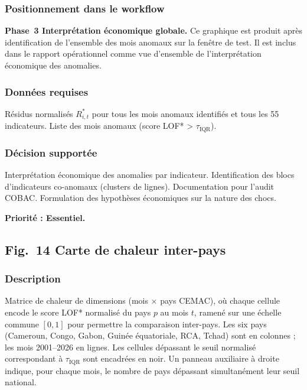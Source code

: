 \documentclass[12pt,a4paper]{article}
\begin{document}
\subsubsection{Positionnement dans le workflow}

\textbf{Phase~3  Interprétation économique globale.} Ce graphique est
produit après identification de l'ensemble des mois anomaux sur la fenêtre
de test. Il est inclus dans le rapport opérationnel comme vue d'ensemble
de l'interprétation économique des anomalies.

\subsubsection{Données requises}

Résidus normalisés $R_{i,t}^*$ pour tous les mois anomaux identifiés et
tous les 55 indicateurs. Liste des mois anomaux (score LOF* > $\tau_{\mathrm{IQR}}$).

\subsubsection{Décision supportée}

Interprétation économique des anomalies par indicateur. Identification
des blocs d'indicateurs co-anomaux (clusters de lignes). Documentation
pour l'audit COBAC. Formulation des hypothèses économiques sur la nature
des chocs.

\textbf{Priorité : Essentiel.}

\subsection{Fig.~14  Carte de chaleur inter-pays}

\subsubsection{Description}

Matrice de chaleur de dimensions (mois × pays CEMAC), où chaque cellule
encode le score LOF* normalisé du pays $p$ au mois $t$, ramené sur une
échelle commune $[0, 1]$ pour permettre la comparaison inter-pays. Les
six pays (Cameroun, Congo, Gabon, Guinée équatoriale, RCA, Tchad) sont
en colonnes ; les mois 2001--2026 en lignes. Les cellules dépassant le
seuil normalisé correspondant à $\tau_{\mathrm{IQR}}$ sont encadrées
en noir. Un panneau auxiliaire à droite indique, pour chaque mois, le
nombre de pays dépassant simultanément leur seuil national.
\end{document}
